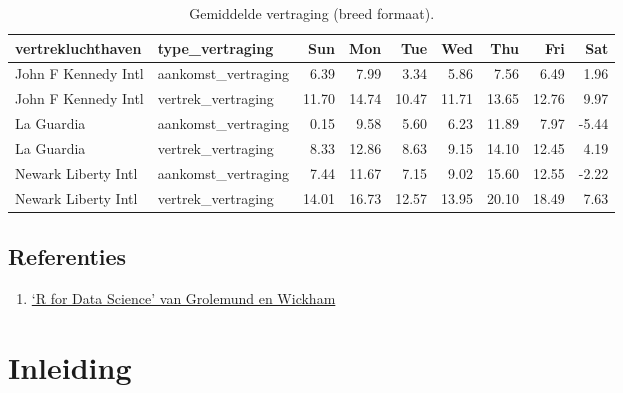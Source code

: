\documentclass[]{memoir}
\newenvironment{Shaded}{\begin{snugshade}}{\end{snugshade}}
\newcommand{\DataTypeTok}[1]{\textcolor[rgb]{0.13,0.29,0.53}{#1}}
\newcommand{\KeywordTok}[1]{\textcolor[rgb]{0.13,0.29,0.53}{\textbf{#1}}}
\newcommand{\NormalTok}[1]{#1}
\newcommand{\OperatorTok}[1]{\textcolor[rgb]{0.81,0.36,0.00}{\textbf{#1}}}
\newcommand{\StringTok}[1]{\textcolor[rgb]{0.31,0.60,0.02}{#1}}
\providecommand{\tightlist}{%
  \setlength{\itemsep}{0pt}\setlength{\parskip}{0pt}}
\begin{document}
\begin{Shaded}
\end{Shaded}

\begin{table}[t]

\caption{\label{tab:7-15b}Gemiddelde vertraging (breed formaat).}
\centering
\fontsize{10}{12}\selectfont
\begin{tabular}{llrrrrrrr}
\toprule
vertrekluchthaven & type\_vertraging & Sun & Mon & Tue & Wed & Thu & Fri & Sat\\
\midrule
John F Kennedy Intl & aankomst\_vertraging & 6.39 & 7.99 & 3.34 & 5.86 & 7.56 & 6.49 & 1.96\\
John F Kennedy Intl & vertrek\_vertraging & 11.70 & 14.74 & 10.47 & 11.71 & 13.65 & 12.76 & 9.97\\
La Guardia & aankomst\_vertraging & 0.15 & 9.58 & 5.60 & 6.23 & 11.89 & 7.97 & -5.44\\
La Guardia & vertrek\_vertraging & 8.33 & 12.86 & 8.63 & 9.15 & 14.10 & 12.45 & 4.19\\
Newark Liberty Intl & aankomst\_vertraging & 7.44 & 11.67 & 7.15 & 9.02 & 15.60 & 12.55 & -2.22\\
\addlinespace
Newark Liberty Intl & vertrek\_vertraging & 14.01 & 16.73 & 12.57 & 13.95 & 20.10 & 18.49 & 7.63\\
\bottomrule
\end{tabular}
\end{table}

\hypertarget{referenties-5}{%
\section{Referenties}\label{referenties-5}}

\begin{enumerate}
\def\labelenumi{\arabic{enumi}.}
\tightlist
\item
  \href{http://r4ds.had.co.nz/}{`R for Data Science' van Grolemund en Wickham}
\end{enumerate}

\hypertarget{inleiding-2}{%
\chapter{Inleiding}\label{inleiding-2}}
\end{document}
